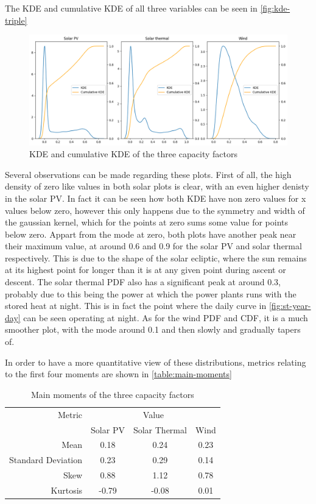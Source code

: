 The KDE and cumulative KDE of all three variables can be seen in \autoref{fig:kde-triple}

\begin{figure}[ht]
    \centering
    \captionsetup{justification=centering}
    \includegraphics[width=\linewidth]{assets/kde-triple.png}
    \caption{KDE and cumulative KDE of the three capacity factors}
    \label{fig:kde-triple}
\end{figure}

Several observations can be made regarding these plots. First of all, the high density of zero like values in both solar plots is clear, with an even higher denisty in the solar PV. In fact it can be seen how both KDE have non zero values for x values below zero, however this only happens due to the symmetry and width of the gaussian kernel, which for the points at zero sums some value for points below zero. Appart from the mode at zero, both plots have another peak near their maximum value, at around 0.6 and 0.9 for the solar PV and solar thermal respectively. This is due to the shape of the solar ecliptic, where the sun remains at its highest point for longer than it is at any given point during ascent or descent. The solar thermal PDF also has a significant peak at around 0.3, probably due to this being the power at which the power plants runs with the stored heat at night. This is in fact the point where the daily curve in \autoref{fig:st-year-day} can be seen operating at night. As for the wind PDF and CDF, it is a much smoother plot, with the mode around 0.1 and then slowly and gradually tapers of. 

In order to have a more quantitative view of these distributions, metrics relating to the first four moments are shown in \autoref{table:main-moments}

\begin{table}[ht]
    \centering
    \begin{tabular}{rccc}
        \toprule
        Metric & \multicolumn{3}{c}{Value} \\ 
        \cmidrule(lr){2-4}
            & Solar PV & Solar Thermal & Wind \\
        \midrule
        Mean & 0.18 & 0.24 & 0.23 \\
        Standard Deviation & 0.23 & 0.29 & 0.14 \\
        Skew & 0.88 & 1.12 & 0.78 \\
        Kurtosis & -0.79 & -0.08 & 0.01 \\
        \bottomrule
    \end{tabular}
    \caption{Main moments of the three capacity factors}
    \label{table:main-moments}
\end{table}

